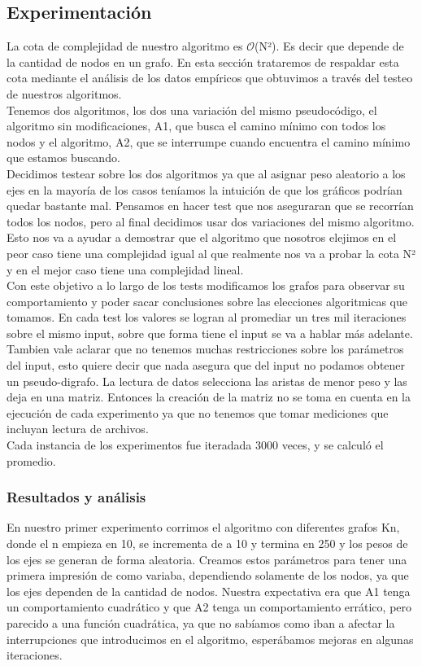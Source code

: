 \documentclass[spanish,12pt]{article}
\begin{document}
\subsection{Experimentación}

La cota de complejidad de nuestro algoritmo es $\mathcal{O}$(N²). Es decir que depende de la cantidad de nodos en un grafo.
En esta sección trataremos de respaldar esta cota mediante el análisis de los datos empíricos que obtuvimos a través del testeo de nuestros algoritmos.
\\
Tenemos dos algoritmos, los dos una variación del mismo pseudocódigo, el algoritmo sin modificaciones, A1, que busca el camino mínimo con todos los nodos y el algoritmo, A2, que se interrumpe cuando encuentra el camino mínimo que estamos buscando.
\\
 Decidimos testear sobre los dos algoritmos ya que al asignar peso aleatorio a los ejes en la mayoría de los casos teníamos la intuición de que los gráficos podrían quedar bastante mal. Pensamos en hacer test que nos aseguraran que se recorrían todos los nodos, pero al final decidimos usar dos variaciones del mismo algoritmo. Esto nos va a ayudar a demostrar que el algoritmo que nosotros elejimos en el peor caso tiene una complejidad igual al que realmente nos va a probar la cota N² y en el mejor caso tiene una complejidad lineal.
\\
Con este objetivo a lo largo de los tests modificamos los grafos para observar su comportamiento y poder sacar conclusiones sobre las elecciones algoritmicas que tomamos. En cada test los valores se logran al promediar un tres mil iteraciones sobre el mismo input, sobre que forma tiene el input se va a hablar más adelante.
\\
Tambien vale aclarar que no tenemos muchas restricciones sobre los parámetros del input, esto quiere decir que nada asegura que del input no podamos obtener un pseudo-digrafo. La lectura de datos selecciona las aristas de menor peso y las deja en una matriz. Entonces la creación de la matriz no se toma en cuenta en la ejecución de cada experimento ya que no tenemos que tomar mediciones que incluyan lectura de archivos.
\\Cada instancia de los experimentos fue iteradada 3000 veces, y se calculó el promedio.
\subsubsection{Resultados y análisis}

En nuestro primer experimento corrimos el algoritmo con diferentes grafos Kn, donde el n empieza en 10, se incrementa de a 10 y termina en 250 y los pesos de los ejes se generan de forma aleatoria. Creamos estos parámetros para tener una primera impresión de como variaba, dependiendo solamente de los nodos, ya que los ejes dependen de la cantidad de nodos. Nuestra expectativa era que A1 tenga un comportamiento cuadrático y que A2 tenga un comportamiento errático, pero parecido a una función cuadrática, ya que no sabíamos como iban a afectar la interrupciones que introducimos en el algoritmo, esperábamos mejoras en algunas iteraciones.
\end{document}
